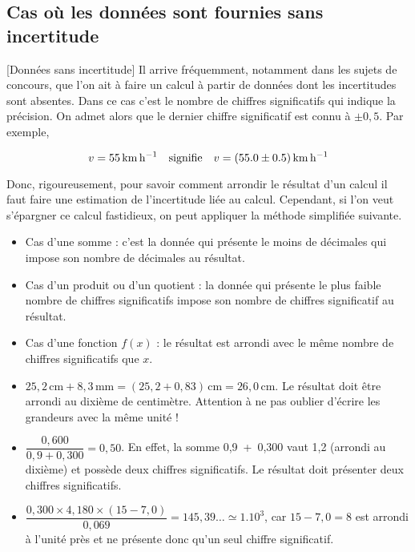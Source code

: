 \subsection{Cas où les données sont fournies sans incertitude}[Données sans incertitude]%
Il arrive fréquemment, notamment dans les sujets de concours, que l'on ait à faire un calcul à partir de données dont les incertitudes sont absentes. Dans ce cas c'est le nombre de chiffres significatifs qui indique la précision. On admet alors que le dernier chiffre significatif est connu à \(\pm 0{,}5\). Par exemple, 

	\[v=\SI{55}{km.h^{-1}}\quad\text{signifie}\quad v=\SI{55,0\pm 0,5}{km.h^{-1}}\]

Donc, rigoureusement, pour savoir comment arrondir le résultat d'un calcul il faut faire une estimation de l'incertitude liée au calcul. Cependant, si l'on veut s'épargner ce calcul fastidieux, on peut appliquer la méthode simplifiée suivante.

\begin{kaobox}[frametitle={Règles de calcul}]
\begin{itemize}
	\item Cas d'une somme : c'est la donnée qui présente le moins de décimales qui impose son nombre de décimales au résultat.
	\item Cas d'un produit ou d'un quotient : la donnée qui présente le plus faible nombre de chiffres significatifs impose son nombre de chiffres significatif au résultat.
	\item Cas d'une fonction \(f(x)\) : le résultat est arrondi avec le même nombre de chiffres significatifs que \(x\).
\end{itemize}
\end{kaobox} 

\begin{kaoexample}[frametitle=Exemples]
\begin{itemize}
	\item \(25{,}2\,\mathrm{cm}+8{,}3\,\mathrm{mm}=(25{,}2+0{,}83)\,\mathrm{cm}=26{,}0\,\mathrm{cm}\). Le résultat doit être arrondi au dixième de centimètre. Attention à ne pas oublier d'écrire les grandeurs avec la même unité !
	\item \(\dfrac{0{,}600}{0{,}9+0{,}300}=0{,}50\). En effet, la somme 0,9~+~0,300 vaut 1,2 (arrondi au dixième) et possède deux chiffres significatifs. Le résultat doit présenter deux chiffres significatifs.
	\item \(\dfrac{0{,}300\times 4{,}180\times(15-7{,}0)}{0{,}069}=145,39\ldots\simeq 1.10^3\), car \(15-7{,}0=8\) est arrondi à l'unité près et ne présente donc qu'un seul chiffre significatif.
\end{itemize}
\end{kaoexample} 



